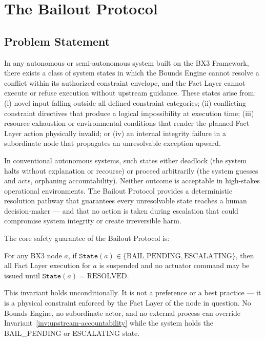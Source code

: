 \section{The Bailout Protocol}
\label{sec:bailout}

\subsection{Problem Statement}

In any autonomous or semi-autonomous system built on the BX3 Framework, there exists a class of system states in which the Bounds Engine cannot resolve a conflict within its authorized constraint envelope, and the Fact Layer cannot execute or refuse execution without upstream guidance. These states arise from: (i) novel input falling outside all defined constraint categories; (ii) conflicting constraint directives that produce a logical impossibility at execution time; (iii) resource exhaustion or environmental conditions that render the planned Fact Layer action physically invalid; or (iv) an internal integrity failure in a subordinate node that propagates an unresolvable exception upward.

In conventional autonomous systems, such states either deadlock (the system halts without explanation or recourse) or proceed arbitrarily (the system guesses and acts, orphaning accountability). Neither outcome is acceptable in high-stakes operational environments. The Bailout Protocol provides a deterministic resolution pathway that guarantees every unresolvable state reaches a human decision-maker — and that no action is taken during escalation that could compromise system integrity or create irreversible harm.

The core safety guarantee of the Bailout Protocol is:

\begin{invariant}
\label{inv:upstream-accountability}
For any BX3 node $a$, if $\texttt{State}(a) \in \{\text{BAIL\_PENDING}, \text{ESCALATING}\}$, then all Fact Layer execution for $a$ is suspended and no actuator command may be issued until $\texttt{State}(a) = \text{RESOLVED}$.
\end{invariant}

This invariant holds unconditionally. It is not a preference or a best practice — it is a physical constraint enforced by the Fact Layer of the node in question. No Bounds Engine, no subordinate actor, and no external process can override Invariant~\ref{inv:upstream-accountability} while the system holds the BAIL\_PENDING or ESCALATING state.

